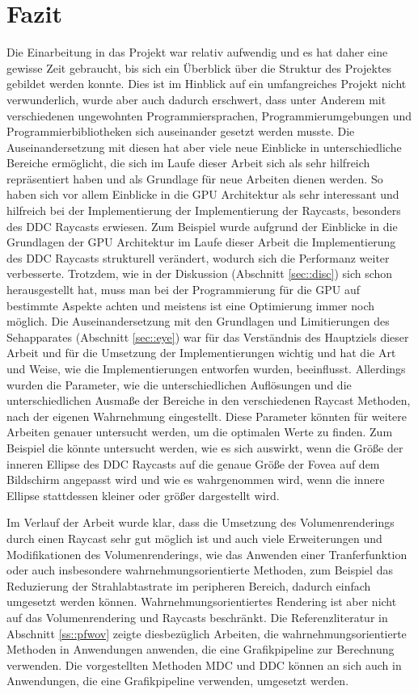 \chapter{Fazit}\label{chap:zusfas}
Die Einarbeitung in das Projekt war relativ aufwendig und es hat daher eine gewisse Zeit gebraucht, bis sich ein Überblick über die Struktur des Projektes gebildet werden konnte.
Dies ist im Hinblick auf ein umfangreiches Projekt nicht verwunderlich, wurde aber auch dadurch erschwert, dass unter Anderem mit verschiedenen ungewohnten Programmiersprachen, Programmierumgebungen und Programmierbibliotheken sich auseinander gesetzt werden musste.
Die Auseinandersetzung mit diesen hat aber viele neue Einblicke in unterschiedliche Bereiche ermöglicht, die sich im Laufe dieser Arbeit sich als sehr hilfreich repräsentiert haben und als Grundlage für neue Arbeiten dienen werden.
So haben sich vor allem Einblicke in die GPU Architektur als sehr interessant und hilfreich bei der Implementierung der Implementierung der Raycasts, besonders des DDC Raycasts erwiesen.
Zum Beispiel wurde aufgrund der Einblicke in die Grundlagen der GPU Architektur im Laufe dieser Arbeit die Implementierung des DDC Raycasts strukturell verändert, wodurch sich die Performanz weiter verbesserte.
Trotzdem, wie in der Diskussion (Abschnitt \ref{sec::disc}) sich schon herausgestellt hat, muss man bei der Programmierung für die GPU auf bestimmte Aspekte achten und meistens ist eine Optimierung immer noch möglich.
Die Auseinandersetzung mit den Grundlagen und Limitierungen des Sehapparates (Abschnitt \ref{sec::eye}) war für das Verständnis des Hauptziels dieser Arbeit und für die Umsetzung der Implementierungen wichtig und hat die Art und Weise, wie die Implementierungen entworfen wurden, beeinflusst.
Allerdings wurden die Parameter, wie die unterschiedlichen Auflösungen und die unterschiedlichen Ausmaße der Bereiche in den verschiedenen Raycast Methoden, nach der eigenen Wahrnehmung eingestellt.
Diese Parameter könnten für weitere Arbeiten genauer untersucht werden, um die optimalen Werte zu finden.
Zum Beispiel die könnte untersucht werden, wie es sich auswirkt, wenn die Größe der inneren Ellipse des DDC Raycasts auf die genaue Größe der Fovea auf dem Bildschirm angepasst wird und wie es wahrgenommen wird, wenn die innere Ellipse stattdessen kleiner oder größer dargestellt wird.

Im Verlauf der Arbeit wurde klar, dass die Umsetzung des Volumenrenderings durch einen Raycast sehr gut möglich ist und auch viele Erweiterungen und Modifikationen des Volumenrenderings, wie das Anwenden einer Tranferfunktion oder auch insbesondere wahrnehmungsorientierte Methoden, zum Beispiel das Reduzierung der Strahlabtastrate im peripheren Bereich, dadurch einfach umgesetzt werden können.
Wahrnehmungsorientiertes Rendering ist aber nicht auf das Volumenrendering und Raycasts beschränkt.
Die Referenzliteratur in Abschnitt \ref{ss::pfwov} zeigte diesbezüglich Arbeiten, die wahrnehmungsorientierte Methoden in Anwendungen anwenden, die eine Grafikpipeline zur Berechnung verwenden.
Die vorgestellten Methoden MDC und DDC können an sich auch in Anwendungen, die eine Grafikpipeline verwenden, umgesetzt werden.

